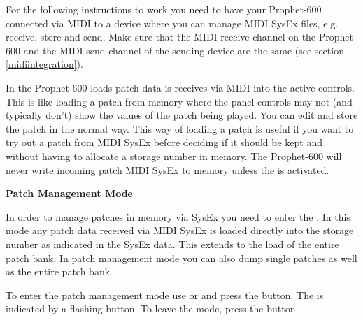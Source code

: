 
For the following instructions to work you need to have your Prophet-600 connected via MIDI to a device where you can manage MIDI SysEx files, e.g. receive, store and send. Make sure that the MIDI receive channel on the Prophet-600 and the MIDI send channel of the sending device are the same (see section \ref{midiintegration}).

In \presetmode the Prophet-600 loads patch data is receives via MIDI into the active controls. This is like loading a patch from memory where the panel controls may not (and typically don't) show the values of the patch being played. You can edit and store the patch in the normal way. This way of loading a patch is useful if you want to try out a patch from MIDI SysEx before deciding if it should be kept and without having to allocate a storage number in memory. The Prophet-600 will never write incoming patch MIDI SysEx to memory unless the \patchmgmt is activated. 

\textbf{Patch Management Mode}

In order to manage patches in memory via SysEx you need to enter the \patchmgmt. In this mode any patch data received via MIDI SysEx is loaded directly into the storage number as indicated in the SysEx data. This extends to the load of the entire patch bank. In patch management mode you can also dump single patches as well as the entire patch bank. 

To enter the patch management mode use \shiftmode or \shiftlock and press the \record button. The \patchmgmt is indicated by a flashing \preset button. To leave the mode, press the \record button. 

